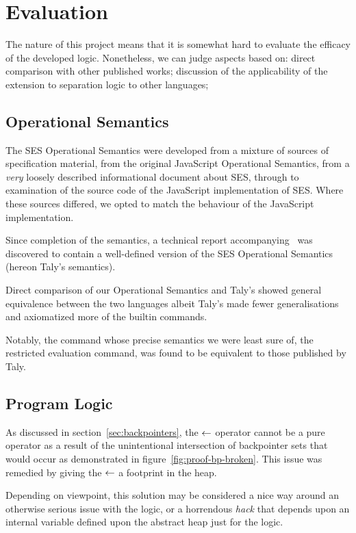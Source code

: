 \documentclass[a4paper,notitlepage]{report}
\begin{document}
\chapter{Evaluation}
The nature of this project means that it is somewhat hard to evaluate the
efficacy of the developed logic. Nonetheless, we can judge aspects based on:
direct comparison with other published works; discussion of the applicability of
the extension to separation logic to other languages; 

\section{Operational Semantics}
The SES Operational Semantics were developed from a mixture of sources of
specification material, from the original JavaScript Operational Semantics, from
a \emph{very} loosely described informational document about SES, through to
examination of the source code of the JavaScript implementation of SES.
Where these sources differed, we opted to match the behaviour of the JavaScript
implementation.

Since completion of the semantics, a technical report
accompanying~\cite{ses-semantics} was discovered to contain a well-defined
version of the SES Operational Semantics (hereon Taly's semantics).

Direct comparison of our Operational Semantics and Taly's
showed general equivalence between the two languages albeit Taly's made fewer
generalisations and axiomatized more of the builtin commands.

Notably, the command whose precise semantics we were least sure of, the
restricted evaluation command, was found to be equivalent to those published by
Taly.

\section{Program Logic}
As discussed in section~\ref{sec:backpointers}, the $\leftarrow$ operator cannot be a
pure operator as a result of the unintentional intersection of backpointer sets
that would occur as demonstrated in figure~\ref{fig:proof-bp-broken}. This issue
was remedied by giving the $\leftarrow$ a footprint in the heap.

Depending on viewpoint, this solution may be considered a nice way around an
otherwise serious issue with the logic, or a horrendous \emph{hack} that depends
upon an internal variable defined upon the abstract heap just for the logic.
\end{document}

